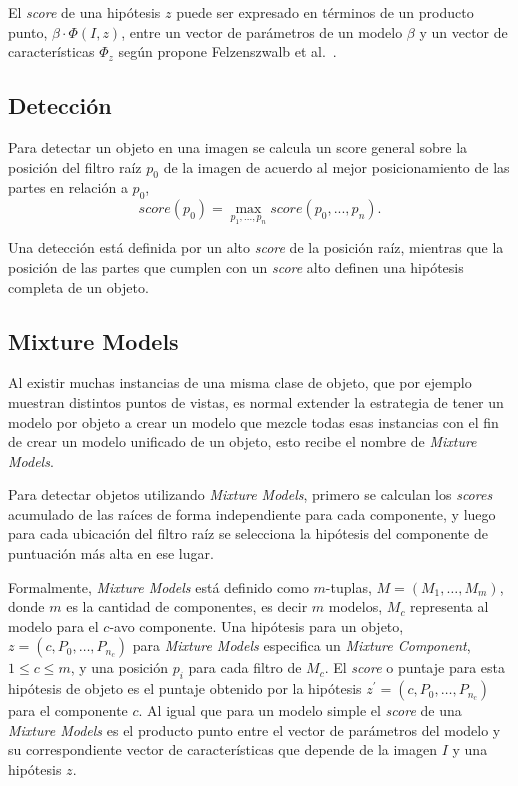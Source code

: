 El \textit{score} de una hipótesis $z$ puede ser expresado en términos de un producto punto, $\beta \cdot \Phi(I, z)$, entre un vector de parámetros de un modelo $\beta$ y un vector de características $\Phi_z$ según propone Felzenszwalb et al.~\cite{Felzenszwalb2013}.

\subsection{Detección}\label{subsec:detection}
Para detectar un objeto en una imagen se calcula un score general sobre la posición del filtro raíz $p_0$ de la imagen de acuerdo al mejor posicionamiento de las partes en relación a $p_0$,
\begin{equation}	\label{max_score}
	\mathit{score}(p_{0}) = \max_{p_{1}, ..., p_{n}} \mathit{score}(p_{0}, ..., p_{n}).
\end{equation}

Una detección está definida por un alto \textit{score} de la posición raíz, mientras que la posición de las partes que cumplen con un \textit{score} alto definen una hipótesis completa de un objeto.

\subsection{Mixture Models}\label{subsec:m_models}
Al existir muchas instancias de una misma clase de objeto, que por ejemplo muestran distintos puntos de vistas, es normal extender la estrategia de tener un modelo por objeto a crear un modelo que mezcle todas esas instancias con el fin de crear un modelo unificado de un objeto, esto recibe el nombre de \textit{Mixture Models}.

Para detectar objetos utilizando \textit{Mixture Models}, primero se calculan los \textit{scores} acumulado de las raíces de forma independiente para cada componente, y luego para cada ubicación del filtro raíz se selecciona la hipótesis del componente de puntuación más alta en ese lugar.

Formalmente, \textit{Mixture Models} está definido como $m$-tuplas, $M = (M_1, \dots, M_m)$, donde $m$ es la cantidad de componentes, es decir $m$ modelos, $M_c$ representa al modelo para el $c$-avo componente. Una hipótesis para un objeto, $z = (c, P_0, \dots, P_{n_c})$ para \textit{Mixture Models} especifica un \textit{Mixture Component}, $1 \leq c \leq m$, y una posición $p_i$ para cada filtro de $M_c$. El \textit{score} o puntaje para esta hipótesis de objeto es el puntaje obtenido por la hipótesis $z^{\prime} = (c, P_0, \dots, P_{n_c})$ para el componente $c$. Al igual que para un modelo simple el \textit{score} de una \textit{Mixture Models} es el producto punto entre el vector de parámetros del modelo y su correspondiente vector de características que depende de la imagen $I$ y una hipótesis $z$.

